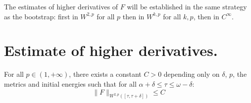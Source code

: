 The estimates of higher derivatives of \(F\) will be established in the same strategy as
the bootstrap: first in \(W^{2,p}\) for all \(p\) then in \(W^{k,p}\) for all \(k,p\), then in \(C^\infty\).

\section{Estimate of higher derivatives.}
\label{sec:org77ab882}

\begin{lemma}[\( W^{2,p} \)-boundedness]
\label{lem:bound-2-p}
For all \(p \in (1,+\infty)\), there exists a constant \(C>0\) depending only on \(\delta\), \(p\), the metrics and initial energies such that for all \(\alpha +\delta \leq \tau \leq \omega-\delta\):
\[
\|F\|_{W^{2,p}([\tau,\tau+\delta])}\leq C
\]
\end{lemma}

